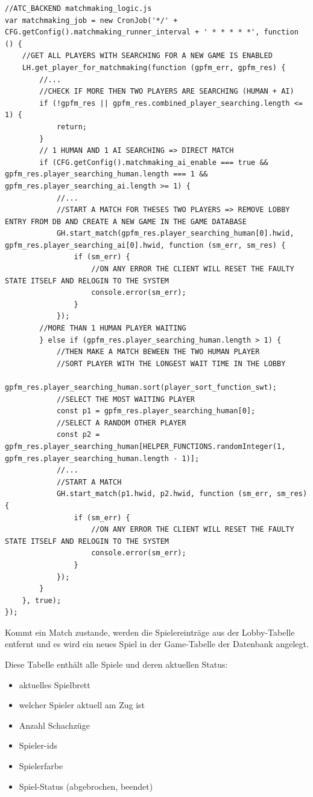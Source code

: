\begin{lstlisting}
//ATC_BACKEND matchmaking_logic.js
var matchmaking_job = new CronJob('*/' + CFG.getConfig().matchmaking_runner_interval + ' * * * * *', function () {
    //GET ALL PLAYERS WITH SEARCHING FOR A NEW GAME IS ENABLED
    LH.get_player_for_matchmaking(function (gpfm_err, gpfm_res) {
        //...
        //CHECK IF MORE THEN TWO PLAYERS ARE SEARCHING (HUMAN + AI)
        if (!gpfm_res || gpfm_res.combined_player_searching.length <= 1) {
            return;
        }
        // 1 HUMAN AND 1 AI SEARCHING => DIRECT MATCH
        if (CFG.getConfig().matchmaking_ai_enable === true && gpfm_res.player_searching_human.length === 1 && gpfm_res.player_searching_ai.length >= 1) {
            //...
            //START A MATCH FOR THESES TWO PLAYERS => REMOVE LOBBY ENTRY FROM DB AND CREATE A NEW GAME IN THE GAME DATABASE
            GH.start_match(gpfm_res.player_searching_human[0].hwid, gpfm_res.player_searching_ai[0].hwid, function (sm_err, sm_res) {
                if (sm_err) {
                    //ON ANY ERROR THE CLIENT WILL RESET THE FAULTY STATE ITSELF AND RELOGIN TO THE SYSTEM
                    console.error(sm_err);
                }
            });
        //MORE THAN 1 HUMAN PLAYER WAITING
        } else if (gpfm_res.player_searching_human.length > 1) {
            //THEN MAKE A MATCH BEWEEN THE TWO HUMAN PLAYER
            //SORT PLAYER WITH THE LONGEST WAIT TIME IN THE LOBBY
            gpfm_res.player_searching_human.sort(player_sort_function_swt);
            //SELECT THE MOST WAITING PLAYER
            const p1 = gpfm_res.player_searching_human[0];
            //SELECT A RANDOM OTHER PLAYER
            const p2 = gpfm_res.player_searching_human[HELPER_FUNCTIONS.randomInteger(1, gpfm_res.player_searching_human.length - 1)];
            //...
            //START A MATCH
            GH.start_match(p1.hwid, p2.hwid, function (sm_err, sm_res) {
                if (sm_err) {
                    //ON ANY ERROR THE CLIENT WILL RESET THE FAULTY STATE ITSELF AND RELOGIN TO THE SYSTEM
                    console.error(sm_err);
                }
            });
        }
    }, true);
});
\end{lstlisting}

Kommt ein Match zustande, werden die Spielereinträge aus der
Lobby-Tabelle entfernt und es wird ein neues Spiel in der Game-Tabelle
der Datenbank angelegt.

Diese Tabelle enthält alle Spiele und deren aktuellen Status:

\begin{itemize}
\tightlist
\item
  aktuelles Spielbrett
\item
  welcher Spieler aktuell am Zug ist
\item
  Anzahl Schachzüge
\item
  Spieler-\gls{id}s
\item
  Spielerfarbe
\item
  Spiel-Status (abgebrochen, beendet)
\end{itemize}

